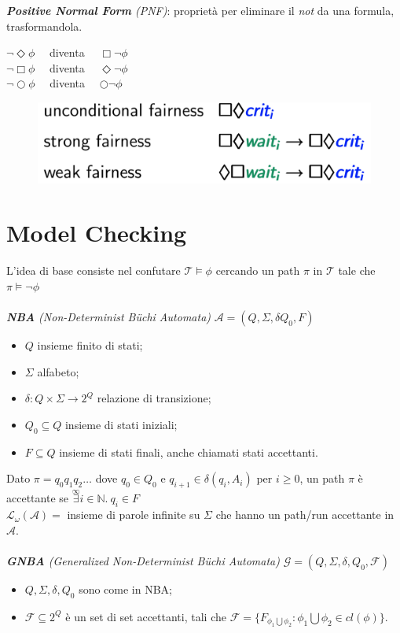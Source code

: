 \documentclass[a4paper, notitlepage, 9pt]{extreport}
\begin{document}
\noindent
\textit{\textbf{Positive Normal Form} (PNF)}: proprietà per eliminare il \textit{not} da una formula, trasformandola.
\begin{multicols}{2}
\noindent
$\lnot \Diamond \phi$ ~~diventa~~ $\Box \lnot \phi$\\
$\lnot \Box \phi$  ~~diventa~~ $\Diamond \lnot \phi$\\
$\lnot \bigcirc \phi$ ~~diventa~~ $\bigcirc \lnot \phi$
\columnbreak
\begin{figure}[H]
	\centering
	\includegraphics[scale=0.25]{D1}
\end{figure}
\end{multicols}


\section*{Model Checking}
L'idea di base consiste nel confutare $\mathcal{T} \vDash \phi$ cercando un path $\pi$ in $\mathcal{T}$ tale che $\pi \vDash \lnot \phi$\\\\
\textit{\textbf{NBA} (Non-Determinist B\"{u}chi Automata)} $\mathcal{A} = (Q, \Sigma, \delta Q_0, F)$
\begin{itemize}
	\item $Q$ insieme finito di stati;
	\item $\Sigma$ alfabeto;
	\item $\delta: Q \times \Sigma \rightarrow 2^Q$ relazione di transizione;
	\item $Q_0 \subseteq Q$ insieme di stati iniziali;
	\item $F \subseteq Q$ insieme di stati finali, anche chiamati stati accettanti.
\end{itemize}


\noindent
Dato $\pi = q_0 q_1 q_2 \dots$ dove $q_0 \in Q_0$ e $q_{i+1} \in \delta(q_i, A_i)$ per $i \geq 0$, un path $\pi$ è accettante se $\stackrel{\infty}{\exists} i \in \mathbb{N}. ~q_i \in F$\\
$\mathcal{L}_\omega(\mathcal{A}) = $ insieme di parole infinite su $\Sigma$ che hanno un path/run accettante in $\mathcal{A}$.\\\\
\textit{\textbf{GNBA} (Generalized Non-Determinist B\"{u}chi Automata)} $\mathcal{G} = (Q, \Sigma, \delta, Q_0, \mathcal{F})$
\begin{itemize}
	\item $Q, \Sigma, \delta, Q_0$ sono come in NBA;
	\item $\mathcal{F} \subseteq 2^Q$ è un set di set accettanti, tali che $\mathcal{F} = \{ F_{\phi_1 \bigcup \phi_2}: \phi_1 \bigcup \phi_2 \in cl(\phi) \}$.
\end{itemize}
\end{document}
